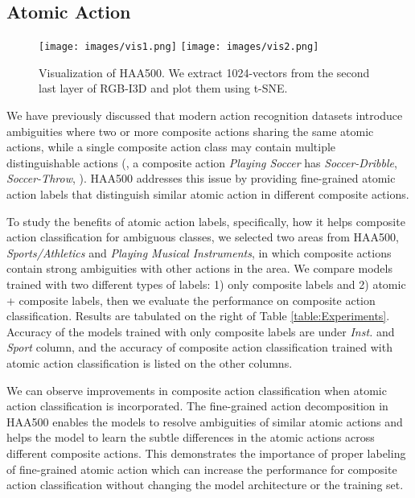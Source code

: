 \documentclass[10pt,twocolumn,letterpaper]{article}
\begin{document}
\vspace{-0.25em}
\subsection{Atomic Action}
\vspace{-0.25em}

\begin{figure}[t!]
\begin{center}
    \texttt{[image: images/vis1.png]}
\endminipage
{}
    \texttt{[image: images/vis2.png]}
\endminipage
\end{center}
\vspace{-1em}
\caption{Visualization of HAA500. We extract 1024-vectors from the second last layer of RGB-I3D and plot them using t-SNE.}
\label{fig:visualization}
\vspace{-1.3em}
\end{figure}

We have previously discussed that modern action recognition datasets introduce ambiguities where two or more composite actions sharing the same atomic actions, while a single composite action class may contain multiple distinguishable actions (\eg, a composite action \textit{Playing Soccer} has \textit{Soccer-Dribble}, \textit{Soccer-Throw}, \etc). HAA500 addresses this issue by providing fine-grained atomic action labels that distinguish similar atomic action in different composite actions. 

To study the benefits of atomic action labels, specifically, how it helps composite action classification for ambiguous classes, we selected two areas from HAA500, \textit{Sports/Athletics} and \textit{Playing Musical Instruments}, in which composite actions contain strong ambiguities with other actions in the area. We compare models trained with two different types of labels: 1) only composite labels and 2) atomic + composite labels, then we evaluate the performance on composite action classification. Results are tabulated on the right of Table \ref{table:Experiments}. Accuracy of the models trained with only composite labels are under \textit{Inst.} and \textit{Sport} column, and the accuracy of composite action classification trained with atomic action classification is listed on the other columns. 

We can observe improvements in composite action classification when atomic action classification is incorporated. The fine-grained action decomposition in HAA500 enables the models to resolve ambiguities of similar atomic actions and helps the model to learn the subtle differences in the atomic actions across different composite actions. 
This demonstrates the importance of proper labeling of fine-grained atomic action which can increase the performance for composite action classification without changing the model architecture or the training set. 
\end{document}
